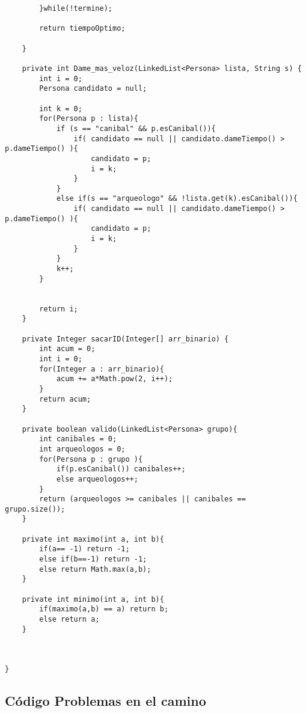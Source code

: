 \begin{lstlisting}
		}while(!termine);
		
		return tiempoOptimo;

	}
	
	private int Dame_mas_veloz(LinkedList<Persona> lista, String s) {
		int i = 0;
		Persona candidato = null;
		
		int k = 0;
		for(Persona p : lista){
			if (s == "canibal" && p.esCanibal()){
				if( candidato == null || candidato.dameTiempo() > p.dameTiempo() ){
					candidato = p;
					i = k;
				}
			}
			else if(s == "arqueologo" && !lista.get(k).esCanibal()){
				if( candidato == null || candidato.dameTiempo() > p.dameTiempo() ){
					candidato = p;
					i = k;
				}
			}
			k++;
		}
		
		
		return i;
	}

	private Integer sacarID(Integer[] arr_binario) {
		int acum = 0;
		int i = 0;
		for(Integer a : arr_binario){
			acum += a*Math.pow(2, i++);
		}
		return acum;
	}

	private boolean valido(LinkedList<Persona> grupo){
		int canibales = 0;
		int arqueologos = 0;
		for(Persona p : grupo ){
			if(p.esCanibal()) canibales++;
			else arqueologos++;
		}
		return (arqueologos >= canibales || canibales == grupo.size());
	}
	
	private int maximo(int a, int b){
		if(a== -1) return -1;
		else if(b==-1) return -1;
		else return Math.max(a,b);
	}
			
	private int minimo(int a, int b){
		if(maximo(a,b) == a) return b;
		else return a;
	}
			


}
	\end{lstlisting}
	
\subsection{C\'odigo Problemas en el camino}

